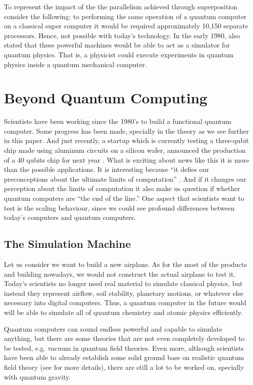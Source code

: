 \documentclass[twoside,11pt]{article}
\begin{document}
To represent the impact of the the parallelism achieved through superposition consider the following: to performing the same operation of a quantum computer on a classical super computer it would be required  approximately 10,150 separate processors.
Hence, not possible with today's technology.
In the early 1980, \cite{feynman1982simulating} also stated that these powerful machines would be able to act as a simulator for quantum physics. 
That is, a physicist could execute experiments in quantum physics inside a quantum mechanical computer.

\section{Beyond Quantum Computing}
\label{sec:bey}

Scientists have been working since the 1980's to build a functional quantum computer.
Some progress has been made, specially in the theory as we see further in this paper.
And just recently, a startup which is currently testing a three-qubit chip made using aluminum circuits on a silicon wafer, announced the production of a 40 qubits chip for next year \citep{mitsu16}.
What is exciting about news like this it is more than the possible applications.
It is interesting because ``it defies our preconceptions about the ultimate limits of computation'' \citep{scott16}.
And if it changes our perception about the limits of computation it also make us question if whether quantum computers are ``the end of the line.''
One aspect that scientists want to test is the scaling behaviour, since we could see profound differences between today’s computers and quantum computers.


\subsection{The Simulation Machine}

Let us consider we want to build a new airplane.
As for the most of the products and building nowadays, we would not construct the actual airplane to test it.
Today’s scientists no longer need real material to simulate classical physics, but instead they represent airflow, soil stability, planetary motions, or whatever else necessary into digital computers.
Thus, a quantum computer in the future would will be able to simulate all of quantum chemistry and atomic physics efficiently.

Quantum computers can sound endless powerful and capable to simulate anything, but there are some theories that are not even completely developed to be tested, e.g. vacuum in quantum field theories.
Even more, although scientists have been able to already establish some solid ground base on realistic quantum field theory (see \citep{jordan2012quantum} for more details), there are still a lot to be worked on, specially with quantum gravity.
\end{document}
